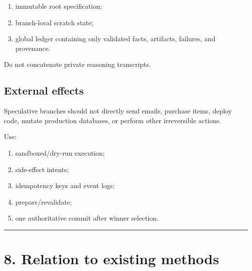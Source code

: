 \documentclass[
  letterpaper,
]{article}
\providecommand{\tightlist}{%
  \setlength{\itemsep}{0pt}\setlength{\parskip}{0pt}}
\begin{document}
\begin{enumerate}
\def\labelenumi{\arabic{enumi}.}
\tightlist
\item
  immutable root specification;
\item
  branch-local scratch state;
\item
  global ledger containing only validated facts, artifacts, failures, and provenance.
\end{enumerate}

Do not concatenate private reasoning transcripts.

\subsection{External effects}\label{external-effects}

Speculative branches should not directly send emails, purchase items, deploy code, mutate production databases, or perform other irreversible actions.

Use:

\begin{enumerate}
\def\labelenumi{\arabic{enumi}.}
\tightlist
\item
  sandboxed/dry-run execution;
\item
  side-effect intents;
\item
  idempotency keys and event logs;
\item
  prepare/revalidate;
\item
  one authoritative commit after winner selection.
\end{enumerate}

\begin{center}\rule{0.5\linewidth}{0.5pt}\end{center}

\section{8. Relation to existing methods}\label{relation-to-existing-methods}
\end{document}
